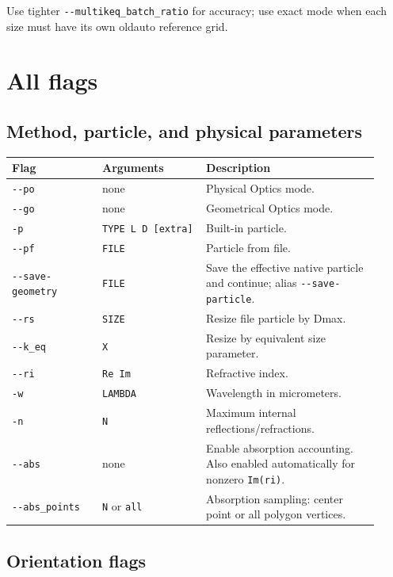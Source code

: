 \documentclass[
  10pt,
  a4paper,
]{article}
\begin{document}
Use tighter \texttt{-\/-multikeq\_batch\_ratio} for accuracy; use exact
mode when each size must have its own oldauto reference grid.

\section{All flags}\label{all-flags}

\subsection{Method, particle, and physical
parameters}\label{method-particle-and-physical-parameters}

\begin{longtable}[]{@{}L{0.24\linewidth}L{0.22\linewidth}L{0.46\linewidth}@{}}
\toprule\noalign{}
Flag & Arguments & Description \\
\midrule\noalign{}
\endhead
\bottomrule\noalign{}
\endlastfoot
\texttt{-\/-po} & none & Physical Optics mode. \\
\texttt{-\/-go} & none & Geometrical Optics mode. \\
\texttt{-p} & \texttt{TYPE\ L\ D\ {[}extra{]}} & Built-in particle. \\
\texttt{-\/-pf} & \texttt{FILE} & Particle from file. \\
\texttt{-\/-save-geometry} & \texttt{FILE} & Save the effective native
particle and continue; alias \texttt{-\/-save-particle}. \\
\texttt{-\/-rs} & \texttt{SIZE} & Resize file particle by Dmax. \\
\texttt{-\/-k\_eq} & \texttt{X} & Resize by equivalent size
parameter. \\
\texttt{-\/-ri} & \texttt{Re\ Im} & Refractive index. \\
\texttt{-w} & \texttt{LAMBDA} & Wavelength in micrometers. \\
\texttt{-n} & \texttt{N} & Maximum internal reflections/refractions. \\
\texttt{-\/-abs} & none & Enable absorption accounting. Also enabled
automatically for nonzero \texttt{Im(ri)}. \\
\texttt{-\/-abs\_points} & \texttt{N} or \texttt{all} & Absorption
sampling: center point or all polygon vertices. \\
\end{longtable}

\subsection{Orientation flags}\label{orientation-flags}
\end{document}
